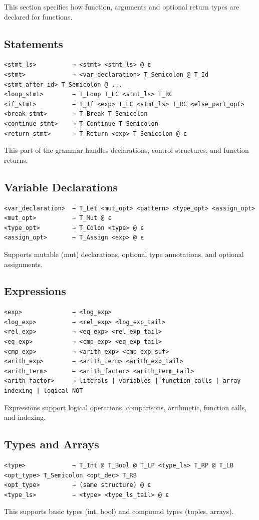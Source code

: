 \documentclass[12pt, a4paper]{report}
\begin{document}
This section specifies how function, arguments and optional return types are declared for functions.



\subsection{Statements}
\begin{lstlisting}
<stmt_ls>          → <stmt> <stmt_ls> @ ε
<stmt>             → <var_declaration> T_Semicolon @ T_Id <stmt_after_id> T_Semicolon @ ...
<loop_stmt>        → T_Loop T_LC <stmt_ls> T_RC
<if_stmt>          → T_If <exp> T_LC <stmt_ls> T_RC <else_part_opt>
<break_stmt>       → T_Break T_Semicolon
<continue_stmt>    → T_Continue T_Semicolon
<return_stmt>      → T_Return <exp> T_Semicolon @ ε
\end{lstlisting}
This part of the grammar handles declarations, control structures, and function returns.



\subsection{Variable Declarations}
\begin{lstlisting}
<var_declaration>  → T_Let <mut_opt> <pattern> <type_opt> <assign_opt>
<mut_opt>          → T_Mut @ ε
<type_opt>         → T_Colon <type> @ ε
<assign_opt>       → T_Assign <exp> @ ε
\end{lstlisting}
Supports mutable (mut) declarations, optional type annotations, and optional assignments.



\subsection{Expressions}
\begin{lstlisting}
<exp>              → <log_exp>
<log_exp>          → <rel_exp> <log_exp_tail>
<rel_exp>          → <eq_exp> <rel_exp_tail>
<eq_exp>           → <cmp_exp> <eq_exp_tail>
<cmp_exp>          → <arith_exp> <cmp_exp_suf>
<arith_exp>        → <arith_term> <arith_exp_tail>
<arith_term>       → <arith_factor> <arith_term_tail>
<arith_factor>     → literals | variables | function calls | array indexing | logical NOT
\end{lstlisting}
Expressions support logical operations, comparisons, arithmetic, function calls, and indexing.



\subsection{Types and Arrays}
\begin{lstlisting}
<type>             → T_Int @ T_Bool @ T_LP <type_ls> T_RP @ T_LB <opt_type> T_Semicolon <opt_dec> T_RB
<opt_type>         → (same structure) @ ε
<type_ls>          → <type> <type_ls_tail> @ ε
\end{lstlisting}
This supports basic types (int, bool) and compound types (tuples, arrays).
\end{document}
